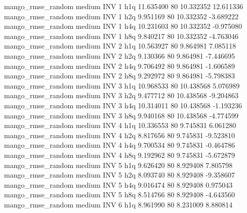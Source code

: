 mango_rmse_random     medium      INV                 1                  h1q 11.635400 80      10.332352          12.611336
mango_rmse_random     medium      INV                 1                  h2q  9.951169 80      10.332352          -3.689222
mango_rmse_random     medium      INV                 1                  h4q 10.231603 80      10.332352          -0.975080
mango_rmse_random     medium      INV                 1                  h8q  9.840217 80      10.332352          -4.763046
mango_rmse_random     medium      INV                 2                  h1q 10.563927 80       9.864981           7.085118
mango_rmse_random     medium      INV                 2                  h2q  9.130366 80       9.864981          -7.446695
mango_rmse_random     medium      INV                 2                  h4q  9.706492 80       9.864981          -1.606589
mango_rmse_random     medium      INV                 2                  h8q  9.292972 80       9.864981          -5.798383
mango_rmse_random     medium      INV                 3                  h1q 10.968533 80      10.438568           5.076989
mango_rmse_random     medium      INV                 3                  h2q  9.477712 80      10.438568          -9.204863
mango_rmse_random     medium      INV                 3                  h4q 10.314011 80      10.438568          -1.193236
mango_rmse_random     medium      INV                 3                  h8q  9.940168 80      10.438568          -4.774599
mango_rmse_random     medium      INV                 4                  h1q 10.336553 80       9.745831           6.061280
mango_rmse_random     medium      INV                 4                  h2q  8.817656 80       9.745831          -9.523810
mango_rmse_random     medium      INV                 4                  h4q  9.700534 80       9.745831          -0.464786
mango_rmse_random     medium      INV                 4                  h8q  9.192962 80       9.745831          -5.672879
mango_rmse_random     medium      INV                 5                  h1q  9.626420 80       8.929408           7.805798
mango_rmse_random     medium      INV                 5                  h2q  8.093740 80       8.929408          -9.358607
mango_rmse_random     medium      INV                 5                  h4q  9.016474 80       8.929408           0.975043
mango_rmse_random     medium      INV                 5                  h8q  8.514766 80       8.929408          -4.643560
mango_rmse_random     medium      INV                 6                  h1q  8.961990 80       8.231009           8.880814
